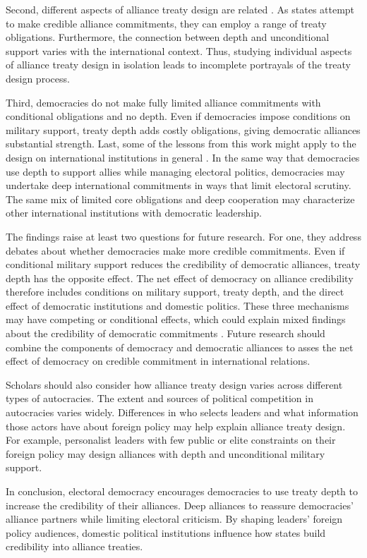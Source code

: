 \documentclass[12pt]{article}
\begin{document}
Second, different aspects of alliance treaty design are related \citep{FjelstulReiter2019}. 
As states attempt to make credible alliance commitments, they can employ a range of treaty obligations. 
Furthermore, the connection between depth and unconditional support varies with the international context. 
Thus, studying individual aspects of alliance treaty design in isolation leads to incomplete portrayals of the treaty design process. 


Third, democracies do not make fully limited alliance commitments with conditional obligations and no depth.
Even if democracies impose conditions on military support, treaty depth adds costly obligations, giving democratic alliances substantial strength.  
Last, some of the lessons from this work might apply to the design on international institutions in general \citep{DownesRocke1995, MartinSimmons1998, Koremenosetal2001, Thompson2010}.
In the same way that democracies use depth to support allies while managing electoral politics, democracies may undertake deep international commitments in ways that limit electoral scrutiny. 
The same mix of limited core obligations and deep cooperation may characterize other international institutions with democratic leadership. 


The findings raise at least two questions for future research.  
For one, they address debates about whether democracies make more credible commitments. 
Even if conditional military support reduces the credibility of democratic alliances, treaty depth has the opposite effect. 
The net effect of democracy on alliance credibility therefore includes conditions on military support, treaty depth, and the direct effect of democratic institutions and domestic politics. 
These three mechanisms may have competing or conditional effects, which could explain mixed findings about the credibility of democratic commitments \citep{Schultz1999, Leeds1999, Thyne2012, DownesSechser2012, PotterBaum2014}.
Future research should combine the components of democracy and democratic alliances to asses the net effect of democracy on credible commitment in international relations. 


Scholars should also consider how alliance treaty design varies across different types of autocracies. 
The extent and sources of political competition in autocracies varies widely. 
Differences in who selects leaders and what information those actors have about foreign policy \citep{Weeks2008} may help explain alliance treaty design.
For example, personalist leaders with few public or elite constraints on their foreign policy may design alliances with depth and unconditional military support. 


In conclusion, electoral democracy encourages democracies to use treaty depth to increase the credibility of their alliances. 
Deep alliances to reassure democracies' alliance partners while limiting electoral criticism. 
By shaping leaders' foreign policy audiences, domestic political institutions influence how states build credibility into alliance treaties.




 
 
\end{document}
